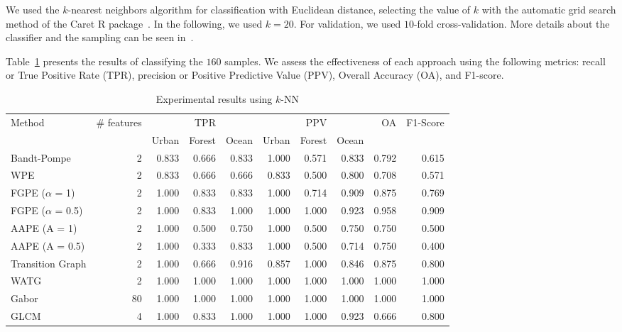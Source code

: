 \documentclass[journal]{IEEEtran}
\begin{document}
We used the $k$-nearest neighbors algorithm for classification with Euclidean distance, selecting the value of $k$ with the automatic grid search method of the Caret R package~\cite{kuhn2008building}.
In the following, we used $k = 20$.
For validation, we used $10$-fold cross-validation.
More details about the classifier and the sampling can be seen in~\cite{mitchell1997machine}.

Table~\ref{tab:result1} presents the results of classifying the $160$ samples.
We assess the effectiveness of each approach using the following metrics: recall or True Positive Rate (TPR), precision or Positive Predictive Value (PPV), Overall Accuracy (OA), and F1-score.

\begin{table}[hbt]
	\centering
	\caption{Experimental results using $k$-NN}
	\label{tab:result1}
	\begin{tabular}{l*9{r}}
		\toprule
		Method      & \multirow{2}{*}{\# features}         &       & TPR   &       &       & PPV    &       & \multirow{2}{*}{OA}  & \multirow{2}{*}{F1-Score} \\ \cmidrule(lr){3-5} \cmidrule(lr){6-8}
		&   & Urban & Forest & Ocean & Urban & Forest & Ocean & &  \\ \midrule
		Bandt-Pompe   & 2 & 0.833 &  0.666  & 0.833 & 1.000 & 0.571  & 0.833 & 0.792 &  0.615  \\ 
		WPE   & 2 & 0.833 &  0.666  & 0.666 & 0.833 & 0.500  & 0.800 & 0.708 &  0.571  \\ 
		FGPE ($\alpha$ = 1)  & 2 & 1.000 &  0.833  & 0.833 & 1.000 & 0.714  & 0.909 & 0.875 &  0.769  \\ 
		FGPE ($\alpha$ = 0.5)   & 2 & 1.000 &  0.833  & 1.000 & 1.000 & 1.000  & 0.923 & 0.958 &  0.909  \\ 
		AAPE (A = 1)   & 2 & 1.000 &  0.500  & 0.750  & 1.000 & 0.500  & 0.750  & 0.750 &  0.500  \\ 
		AAPE (A = 0.5)   & 2 & 1.000 &  0.333  & 0.833 & 1.000 & 0.500  & 0.714 & 0.750 &  0.400  \\ 
		Transition Graph & 2  & 1.000 & 0.666  & 0.916 & 0.857 & 1.000  & 0.846 & 0.875 & 0.800 \\
		WATG        & 2  & 1.000 & 1.000  & 1.000 & 1.000 & 1.000  & 1.000 & 1.000 & 1.000 \\ 
		Gabor           & 80  & 1.000 & 1.000  & 1.000 & 1.000 & 1.000  & 1.000 & 1.000 & 1.000\\
		GLCM            & 4   & 1.000 & 0.833  & 1.000 & 1.000 & 1.000  & 0.923 & 0.666 & 0.800\\
		\bottomrule
	\end{tabular}
\end{table}
\end{document}
